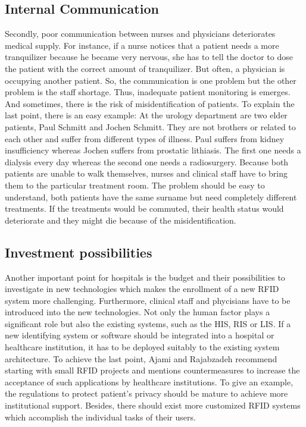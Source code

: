 \subsection{Internal Communication}
Secondly, poor communication between nurses and physicians deteriorates medical supply. For instance, if a nurse notices that a patient needs a more tranquilizer because he became very nervous, she has to tell the doctor to dose the patient with the correct amount of tranquilizer. But often, a physician is occupying another patient. So, the communication is one problem but the other problem is the staff shortage. Thus, inadequate patient monitoring is emerges. And sometimes, there is the risk of misidentification of patients. To explain the last point, there is an easy example: At the urology department are two elder patients, Paul Schmitt and Jochen Schmitt. They are not brothers or related to each other and suffer from different types of illness. Paul suffers from kidney insufficiency whereas Jochen suffers from prostatic lithiasis. The first one needs a dialysis every day whereas the second one needs a radiosurgery. Because both patients are unable to walk themselves, nurses and clinical staff have to bring them to the particular treatment room. The problem should be easy to understand, both patients have the same surname but need completely different treatments. If the treatments would be commuted, their health status would deteriorate and they might die because of the misidentification.

\subsection{Investment possibilities}
Another important point for hospitals is the budget and their possibilities to investigate in new technologies which makes the enrollment of a new RFID system more challenging. Furthermore, clinical staff and phycisians have to be introduced into the new technologies. Not only the human factor plays a significant role but also the existing systems, such as the \ac{HIS}, \ac{RIS} or \ac{LIS}. If a new identifying system or software should be integrated into a hospital or healthcare institution, it has to be deployed suitably to the existing system architecture. To achieve the last point, Ajami and Rajabzadeh \cite{ncbi} recommend starting with small RFID projects and mentions countermeasures to increase the acceptance of such applications by healthcare institutions. To give an example, the regulations to protect patient's privacy should be mature to achieve more institutional support. Besides, there should exist more customized RFID systems which accomplish the individual tasks of their users.  

